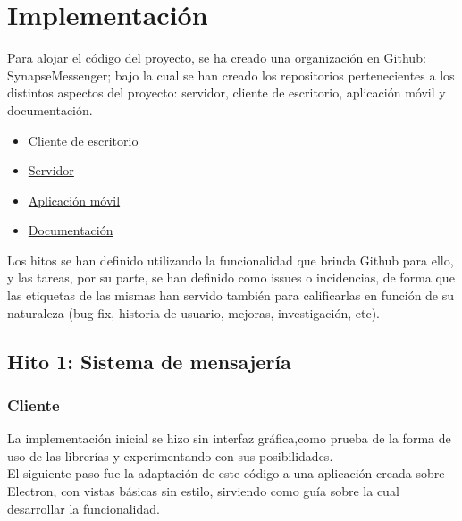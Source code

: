 \chapter{Implementación}

Para alojar el código del proyecto, se ha creado una organización en Github: SynapseMessenger; bajo la cual se han creado los repositorios pertenecientes a los distintos aspectos del proyecto: servidor, cliente de escritorio, aplicación móvil y documentación. \\ 

\begin{itemize}
	\item {\href{https://github.com/SynapseMessenger/Synapse-Desktop}{Cliente de escritorio}}
	\item {\href{https://github.com/SynapseMessenger/Synapse-Server}{Servidor}}
	\item {\href{https://github.com/SynapseMessenger/Synapse-App}{Aplicación móvil}}
	\item {\href{https://github.com/SynapseMessenger/Project-Report}{Documentación}}
\end{itemize}

Los hitos se han definido utilizando la funcionalidad que brinda Github para ello, y las tareas, por su parte, se han definido como issues o incidencias, de forma que las etiquetas de las mismas han servido también para calificarlas en función de su naturaleza (bug fix, historia de usuario, mejoras, investigación, etc). \\

\section {Hito 1: Sistema de mensajería}

\subsection{Cliente}
La implementación inicial se hizo sin interfaz gráfica,como prueba de la forma de uso de las librerías y experimentando con sus posibilidades. \\

El siguiente paso fue la adaptación de este código a una aplicación creada sobre Electron, con vistas básicas sin estilo, sirviendo como guía sobre la cual desarrollar la funcionalidad. \\

